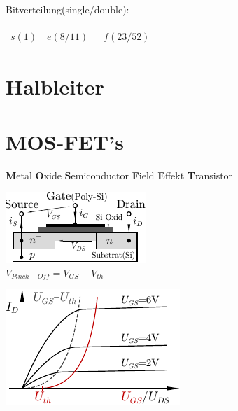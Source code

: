 \documentclass[6pt,a4paper]{scrartcl}
\begin{document}
\begin{multicols}{3}
{	Bitverteilung(single/double):
	\begin{tabular}{|c|c|c|} \hline 
		$s(1)$ & \quad $e(8/11)$ \quad\qquad & \qquad\qquad\ $f(23/52)$\qquad\qquad\qquad \\ \hline
	\end{tabular}
	}

\section{Halbleiter}

\section{MOS-FET's}
\textbf{M}etal \textbf{O}xide \textbf{S}emiconductor \textbf{F}ield \textbf{E}ffekt \textbf{T}ransistor\\
\parbox{4.0cm}{ \includegraphics{./img/ds/mosfet.pdf} \\ $V_{Pinch-Off} = V_{GS} - V_{th}$ } \parbox{3.0cm}{ \includegraphics{./img/ds/char_nmos.pdf} } 


	\sectionbox{
}
\end{multicols}
\end{document}
